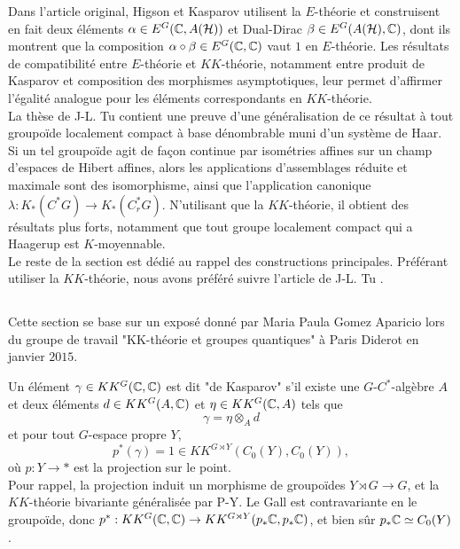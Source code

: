 Dans l'article original, Higson et Kasparov utilisent la $E$-théorie et construisent en fait deux éléments $\alpha\in E^G(\mathbb C,A(\mathcal H))$ et Dual-Dirac $\beta\in E^G(A(\mathcal H),\mathbb C)$, dont ils montrent que la composition $\alpha \circ \beta \in E^G(\mathbb C,\mathbb C)$ vaut $1$ en $E$-théorie. Les résultats de compatibilité entre $E$-théorie et $KK$-théorie, notamment entre produit de Kasparov et composition des morphismes asymptotiques, leur permet d'affirmer l'égalité analogue pour les éléments correspondants en $KK$-théorie. \\

La thèse de J-L. Tu contient une preuve d'une généralisation de ce résultat à tout groupoïde localement compact à base dénombrable muni d'un système de Haar. Si un tel groupoïde agit de façon continue par isométries affines sur un champ d'espaces de Hibert affines, alors les applications d'assemblages réduite et maximale sont des isomorphisme, ainsi que l'application canonique $\lambda : K_*(C^*G)\rightarrow K_*(C_r^* G)$. N'utilisant que la $KK$-théorie, il obtient des résultats plus forts, notamment que tout groupe localement compact qui a Haagerup est $K$-moyennable.\\ 

Le reste de la section est dédié au rappel des constructions principales. Préférant utiliser la $KK$-théorie, nous avons préféré suivre l'article de J-L. Tu \cite{TuThese}. 

\subsection{}
Cette section se base sur un exposé donné par Maria Paula Gomez Aparicio lors du groupe de travail "KK-théorie et groupes quantiques" à Paris Diderot en janvier $2015$.\\

\begin{definition}
Un élément $\gamma \in KK^{G}(\mathbb C,\mathbb C)$ est dit "de Kasparov" s'il existe une $G$-$C^*$-algèbre $A$ et deux éléments $d\in KK^{G}(A,\mathbb C)$ et $\eta \in KK^{G}(\mathbb C,A)$ tels que
\[\gamma = \eta \otimes_A d \]
et pour tout $G$-espace propre $Y$,
\[p^*(\gamma)=1\in KK^{G\rtimes Y}(C_0(Y),C_0(Y)),\]
où $p : Y\rightarrow *$ est la projection sur le point. \\

Pour rappel, la projection induit un morphisme de groupoïdes $Y \rtimes G\rightarrow G$, et la $KK$-théorie bivariante généralisée par P-Y. Le Gall est contravariante en le groupoïde, donc $p^* : KK^G(\mathbb C,\mathbb C)\rightarrow KK^{G\rtimes Y}(p_* \mathbb C,p_* \mathbb C)$, et bien sûr $p_*\mathbb C \simeq C_0(Y)$.
\end{definition}%

